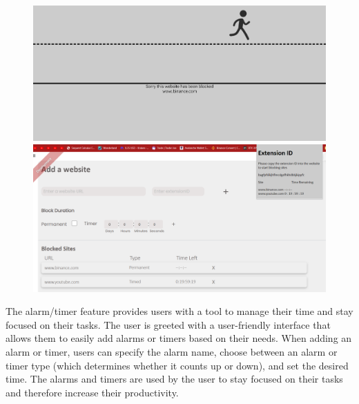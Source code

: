 \documentclass[a4paper]{article}
\begin{document}
\begin{figure}[H]
    \centering
    \begin{minipage}{0.49\textwidth}
      \centering
      \includegraphics[width=\linewidth]{./image/BlockedWebsite.png}
    \end{minipage}\hfill
    \begin{minipage}{0.49\textwidth}
      \centering
      \includegraphics[width=\linewidth]{./image/AntiProcr.png}
    \end{minipage}
\end{figure}

The alarm/timer feature provides users with a tool to manage their time and stay focused on their tasks. The user is greeted with a user-friendly interface that allows them to easily add alarms or timers based on their needs. When adding an alarm or timer, users can specify the alarm name, choose between an alarm or timer type (which determines whether it counts up or down), and set the desired time. The alarms and timers are used by the user to stay focused on their tasks and therefore increase their productivity.
\end{document}
